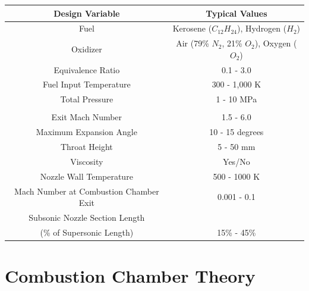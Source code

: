 \begin{table}[!h]
\begin{center}
\begin{threeparttable}


\begin{tabular}{cc}
\toprule
Design Variable 		&	Typical Values\\
\midrule
Fuel				&	Kerosene ($C_{12} H_{24}$), Hydrogen ($H_2$)\\
Oxidizer			&	Air (79\% $N_2$, 21\% $O_2$), Oxygen ($O_2$)\\
Equivalence Ratio	        &	0.1 - 3.0\\
Fuel Input Temperature		&	300 - 1,000 K\\
Total Pressure			&	1 - 10 MPa\\
\\

Exit Mach Number		& 	1.5 - 6.0\\
Maximum Expansion Angle		&       10 - 15 degrees\\
Throat Height  			& 	5 - 50 mm\\
Viscosity			&	Yes/No\\
Nozzle Wall Temperature	 	&	500 - 1000 K\\
Mach Number at Combustion Chamber Exit &	0.001 - 0.1\\
Subsonic Nozzle Section Length \\(\% of Supersonic Length) &	15\% - 45\%\\  
\bottomrule
\end{tabular}


\label{table:inputvariables}
\end{threeparttable}
\end{center}
\end{table}


\section{Combustion Chamber Theory}

